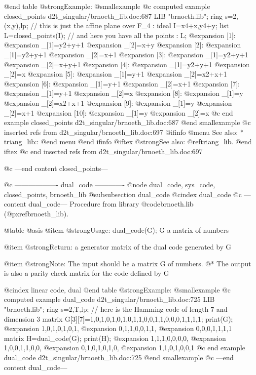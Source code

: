 @end table
@strong{Example:}
@smallexample
@c computed example closed_points d2t_singular/brnoeth_lib.doc:687 
LIB "brnoeth.lib";
ring s=2,(x,y),lp;
// this is just the affine plane over F_4 :
ideal I=x4+x,y4+y;
list L=closed_points(I);
// and here you have all the points :
L;
@expansion{} [1]:
@expansion{}    _[1]=y2+y+1
@expansion{}    _[2]=x+y
@expansion{} [2]:
@expansion{}    _[1]=y2+y+1
@expansion{}    _[2]=x+1
@expansion{} [3]:
@expansion{}    _[1]=y2+y+1
@expansion{}    _[2]=x+y+1
@expansion{} [4]:
@expansion{}    _[1]=y2+y+1
@expansion{}    _[2]=x
@expansion{} [5]:
@expansion{}    _[1]=y+1
@expansion{}    _[2]=x2+x+1
@expansion{} [6]:
@expansion{}    _[1]=y+1
@expansion{}    _[2]=x+1
@expansion{} [7]:
@expansion{}    _[1]=y+1
@expansion{}    _[2]=x
@expansion{} [8]:
@expansion{}    _[1]=y
@expansion{}    _[2]=x2+x+1
@expansion{} [9]:
@expansion{}    _[1]=y
@expansion{}    _[2]=x+1
@expansion{} [10]:
@expansion{}    _[1]=y
@expansion{}    _[2]=x
@c end example closed_points d2t_singular/brnoeth_lib.doc:687
@end smallexample
@c inserted refs from d2t_singular/brnoeth_lib.doc:697
@ifinfo
@menu
See also:
* triang_lib::
@end menu
@end ifinfo
@iftex
@strong{See also:}
@ref{triang_lib}.
@end iftex
@c end inserted refs from d2t_singular/brnoeth_lib.doc:697

@c ---end content closed_points---

@c ------------------- dual_code -------------
@node dual_code, sys_code, closed_points, brnoeth_lib
@subsubsection dual_code
@cindex dual_code
@c ---content dual_code---
Procedure from library @code{brnoeth.lib} (@pxref{brnoeth_lib}).

@table @asis
@item @strong{Usage:}
dual_code(G); G a matrix of numbers

@item @strong{Return:}
a generator matrix of the dual code generated by G

@item @strong{Note:}
The input should be a matrix G of numbers. @*
The output is also a parity check matrix for the code defined by G

@cindex linear code, dual
@end table
@strong{Example:}
@smallexample
@c computed example dual_code d2t_singular/brnoeth_lib.doc:725 
LIB "brnoeth.lib";
ring s=2,T,lp;
// here is the Hamming code of length 7 and dimension 3
matrix G[3][7]=1,0,1,0,1,0,1,0,1,1,0,0,1,1,0,0,0,1,1,1,1;
print(G);
@expansion{} 1,0,1,0,1,0,1,
@expansion{} 0,1,1,0,0,1,1,
@expansion{} 0,0,0,1,1,1,1 
matrix H=dual_code(G);
print(H);
@expansion{} 1,1,1,0,0,0,0,
@expansion{} 1,0,0,1,1,0,0,
@expansion{} 0,1,0,1,0,1,0,
@expansion{} 1,1,0,1,0,0,1 
@c end example dual_code d2t_singular/brnoeth_lib.doc:725
@end smallexample
@c ---end content dual_code---

